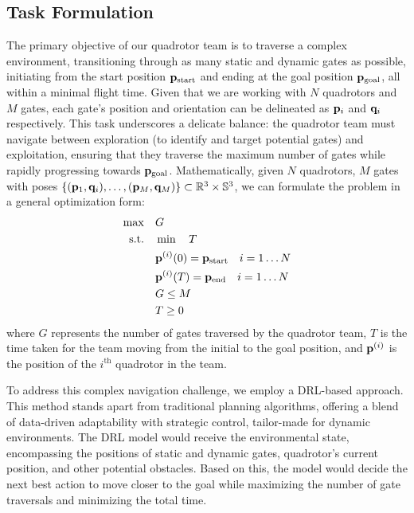 \documentclass[letterpaper,journal,twoside]{IEEEtran}
\begin{document}
\subsection{Task Formulation}

The primary objective of our quadrotor team is to traverse a 
complex environment, transitioning through as many static and 
dynamic gates as possible, initiating from the start position 
$ \mathbf{p}_{\text{start}} $ and ending at the goal position 
$ \mathbf{p}_{\text{goal}} $, all within a minimal flight time. 
Given that we are working with $ N $ quadrotors and $ M $ 
gates, 
each gate's position and orientation can be delineated as 
$ \mathbf{p}_i $
and $ \mathbf{q}_i $respectively. 
This task underscores a delicate balance: 
the quadrotor team must navigate between 
exploration (to identify and target potential gates)
and exploitation, 
ensuring that they traverse the maximum number of gates while 
rapidly progressing towards $ \mathbf{p}_{\text{goal}} $.
Mathematically, given $N$ quadrotors, $M$ gates 
with poses $\left\{(\mathbf{p}_1,\mathbf{q}_i), \dots, 
(\mathbf{p}_M, \mathbf{q}_M)\right\} 
\subset \mathbb{R}^3\times\mathbb{S}^3$, we can 
formulate the problem in a general optimization form:
\begin{equation}
  \label{eq:general_opt}
  \begin{aligned}
    \max \quad & G \\
    \textrm{s.t.} \quad & \min \quad T \\
    & \mathbf{p}^{(i)}(0) = \mathbf{p}_\text{start} \quad i = 1\dots N \\
    & \mathbf{p}^{(i)}(T) = \mathbf{p}_\text{end} \quad i = 1\dots N \\
    & G \le M \\
    & T \ge 0
  \end{aligned}
\end{equation}
where $G$ represents the number of gates traversed by the 
quadrotor team, $T$ is the time taken for the team moving
from the initial to the goal position, and $\mathbf{p}^{(i)}$ 
is the position of the $i^{\text{th}}$ quadrotor in the 
team. 

To address this complex navigation challenge, we employ a 
DRL-based approach. 
This method stands apart from traditional planning algorithms, 
offering a blend of data-driven adaptability with strategic 
control, tailor-made for dynamic environments.
The DRL model would receive the environmental state, encompassing 
the positions of static and dynamic gates, quadrotor's current 
position, and other potential obstacles. 
Based on this, the model would decide the next best action to move closer to the goal 
while maximizing the number of gate traversals and minimizing the 
total time.





\end{document}
